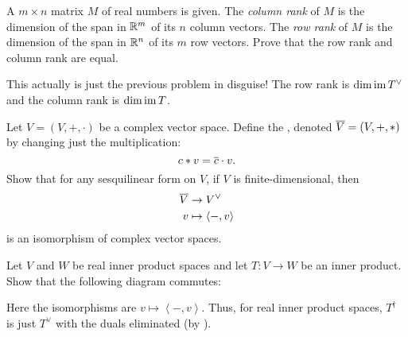 \begin{dproblem}
	A $m \times n$ matrix $M$ of real numbers is given.
	The \emph{column rank} of $M$ is the dimension of the span in $\mathbb R^m$
	of its $n$ column vectors.
	The \emph{row rank} of $M$ is the dimension of the span in $\mathbb R^n$
	of its $m$ row vectors.
	Prove that the row rank and column rank are equal.
	\begin{hint}
		This actually is just the previous problem in disguise!
		The row rank is $\dim \operatorname{im} T^\vee$
		and the column rank is $\dim \operatorname{im} T$.
	\end{hint}
\end{dproblem}

\begin{problem}
	\label{prob:complex_conj_space}
	Let $V = (V, +, \cdot)$ be a complex vector space.
	Define the ,
	denoted $\overline V = (V, +, \ast)$
	by changing just the multiplication:
	\[ c \ast v = \overline c \cdot v. \]
	Show that for any sesquilinear form on $V$,
	if $V$ is finite-dimensional, then
	\begin{align*}
		\overline V & \to V^\vee \\
		v &\mapsto \left< -, v \right>
	\end{align*}
	is an isomorphism of complex vector spaces.
\end{problem}

\begin{problem}
	Let $V$ and $W$ be real inner product spaces
	and let $T \colon V \to W$ be an inner product.
	Show that the following diagram commutes:
	\begin{center}
	\end{center}
	Here the isomorphisms are $v \mapsto \left< -, v\right>$.
	Thus, for real inner product spaces,
	$T^\dagger$ is just $T^\vee$ with the duals eliminated
	(by ).
\end{problem}

